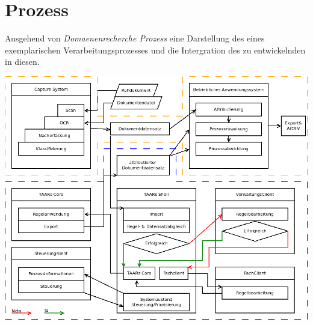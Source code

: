 \chapter{Prozess}
%
%
Ausgehend von \textit{Domaenenrecherche \> Prozess} eine Darstellung des eines exemplarischen Verarbeitungsprozesses und 
die Intergration des zu entwickelnden \brand in diesen.

\includegraphics[width=\textwidth]{EISWS11516Howe_Prozess.png}
\noindent